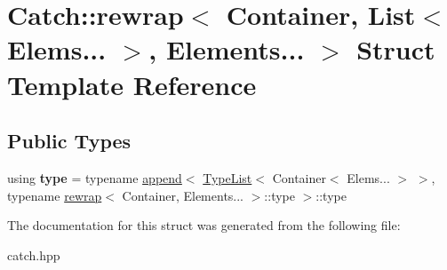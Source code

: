 \hypertarget{structCatch_1_1rewrap_3_01Container_00_01List_3_01Elems_8_8_8_01_4_00_01Elements_8_8_8_01_4}{}\section{Catch\+::rewrap$<$ Container, List$<$ Elems... $>$, Elements... $>$ Struct Template Reference}
\label{structCatch_1_1rewrap_3_01Container_00_01List_3_01Elems_8_8_8_01_4_00_01Elements_8_8_8_01_4}
\subsection*{Public Types}
\begin{DoxyCompactItemize}
\item 
\mbox{\label{structCatch_1_1rewrap_3_01Container_00_01List_3_01Elems_8_8_8_01_4_00_01Elements_8_8_8_01_4_a1dea55d690c2ee00d81e44dff797bd22}} 
using {\bfseries type} = typename \mbox{\hyperlink{structCatch_1_1append}{append}}$<$ \mbox{\hyperlink{structCatch_1_1TypeList}{Type\+List}}$<$ Container$<$ Elems... $>$ $>$, typename \mbox{\hyperlink{structCatch_1_1rewrap}{rewrap}}$<$ Container, Elements... $>$\+::type $>$\+::type
\end{DoxyCompactItemize}


The documentation for this struct was generated from the following file\+:\begin{DoxyCompactItemize}
\item 
catch.\+hpp\end{DoxyCompactItemize}
